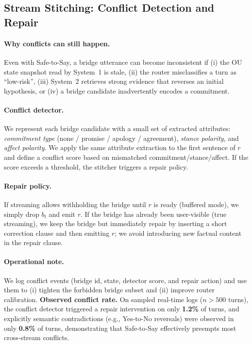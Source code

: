 \documentclass[11pt]{article}
\begin{document}
\subsection{Stream Stitching: Conflict Detection and Repair}
\label{app:stitching-conflicts}
\paragraph{Why conflicts can still happen.}
Even with Safe-to-Say, a bridge utterance can become inconsistent if (i) the OU state snapshot read by System~1 is stale, (ii) the router misclassifies a turn as ``low-risk'', (iii) System~2 retrieves strong evidence that reverses an initial hypothesis, or (iv) a bridge candidate inadvertently encodes a commitment.

\paragraph{Conflict detector.}
We represent each bridge candidate with a small set of extracted attributes: \textit{commitment type} (none / promise / apology / agreement), \textit{stance polarity}, and \textit{affect polarity}. We apply the same attribute extraction to the first sentence of $r$ and define a conflict score based on mismatched commitment/stance/affect.
If the score exceeds a threshold, the stitcher triggers a repair policy.

\paragraph{Repair policy.}
If streaming allows withholding the bridge until $r$ is ready (buffered mode), we simply drop $b_t$ and emit $r$.
If the bridge has already been user-visible (true streaming), we keep the bridge but immediately repair by inserting a short correction clause and then emitting $r$; we avoid introducing new factual content in the repair clause.

\paragraph{Operational note.}
We log conflict events (bridge id, state, detector score, and repair action) and use them to (i) tighten the forbidden bridge subset and (ii) improve router calibration.
\textbf{Observed conflict rate.} On sampled real-time logs ($n > 500$ turns), the conflict detector triggered a repair intervention on only \textbf{1.2\%} of turns, and explicitly semantic contradictions (e.g., Yes-to-No reversals) were observed in only \textbf{0.8\%} of turns, demonstrating that Safe-to-Say effectively preempts most cross-stream conflicts.
\end{document}
